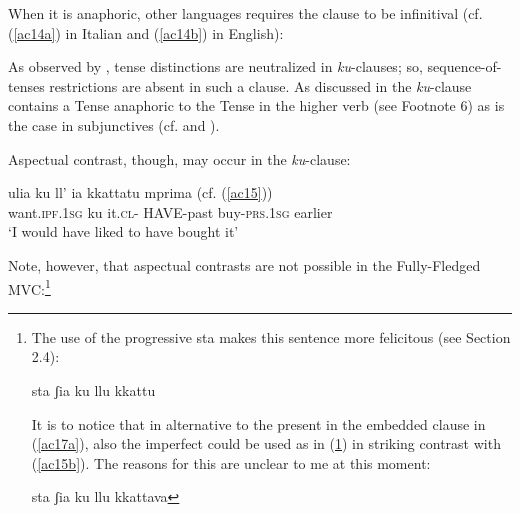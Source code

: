 \documentclass[output=paper]{langscibook}
\begin{document}
When it is anaphoric, other languages requires the clause to be infinitival (cf. (\ref{ac14a}) in Italian and (\ref{ac14b}) in English):

\ea \label{ac14}
    \z
\z

As observed by \citet{calabrese1993a}, tense distinctions are neutralized in \textit{ku}-clauses; so, sequence-of-tenses restrictions are absent in such a clause.  As discussed in \citet{calabrese1993a} the \textit{ku}-clause contains a Tense anaphoric to the Tense in the higher verb (see Footnote 6) as is the case in subjunctives (cf. \citealt[46–48]{calabrese1993a} and \citealt[652]{manzini2005a}).

\ea \label{ac15}
    \z
\z

Aspectual contrast, though, may occur in the \textit{ku}-clause:

\ea \label{ac16}\gll ulia         ku  ll’   ia    kkattatu     mprima  (cf. (\ref{ac15}))\\
  want.\textsc{ipf}.\textsc{1sg} ku  it.\textsc{cl}- HAVE-past buy-\textsc{prs}.\textsc{1sg} earlier\\
 \glt ‘I would have liked to have bought it’
\z

Note, however, that aspectual contrasts are not possible in the Fully-Fledged MVC:\footnote{The use of the progressive sta makes this sentence more felicitous (see Section 2.4):

\ea \label{fn7ex} {sta ʃia ku llu kkattu}
\z

It is to notice that in alternative to the present in the embedded clause in (\ref{ac17a}), also the imperfect could be used as in (\ref{fn7ex2}) in striking contrast with (\ref{ac15b}). The reasons for this are unclear to me at this moment:

\ea \label{fn7ex2}{sta ʃia ku llu kkattava}
\z}
\end{document}
